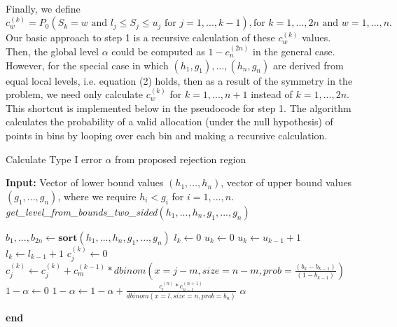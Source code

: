 \documentclass[article]{jss}
\begin{document}
Finally, we define
%
\begin{equation*}
    c_{w}^{(k)} = P_{0}(S_{k} = w \textrm{ and } l_{j} \leq S_{j} \leq u_{j} \textrm{ for } j = 1, ..., k - 1), \textrm{for } k = 1, ..., 2n \textrm{ and } w = 1, ..., n.
\end{equation*}
%
Our basic approach to step 1 is a recursive calculation of these $c_{w}^{(k)}$ values. Then, the global level $\alpha$ could be computed as $1 - c_{n}^{(2n)}$ in the general case. However, for the special case in which $(h_{1}, g_{1}), ..., (h_{n}, g_{n})$ are derived from equal local levels, i.e. equation (2) holds, then as a result of the symmetry in the problem, we need only calculate $c_{w}^{(k)}$ for $k = 1, ..., n+1$ instead of $k = 1, ... , 2n$. This shortcut is implemented below in the pseudocode for step 1. The algorithm calculates the probability of a valid allocation (under the null hypothesis) of points in bins by looping over each bin and making a recursive calculation.
\begin{algorithm}[H]
\caption{Calculate Type I error $\alpha$ from proposed rejection region}
\textbf{Input:} Vector of lower bound values $(h_{1}, ..., h_{n})$, vector of upper bound values $(g_{1}, ..., g_{n})$, where we require $h_{i} < g_{i}$ for $i = 1, ..., n$.
\newline
\textit{get\_level\_from\_bounds\_two\_sided}$(h_{1}, ..., h_{n}, g_{1}, ..., g_{n})$
\begin{algorithmic}[1]
\STATE $b_{1}, ..., b_{2n} \leftarrow \textbf{sort}(h_{1}, ..., h_{n}, g_{1}, ..., g_{n})$
\STATE $l_{k} \leftarrow 0$
\STATE $u_{k} \leftarrow 0$
\STATE $u_{k} \leftarrow u_{k - 1} + 1$
\ENDIF
{}
\STATE $l_{k} \leftarrow l_{k - 1} + 1$
\ENDIF
{}
\STATE $c_{j}^{(k)} \leftarrow 0 $
\STATE $c_{j}^{(k)} \leftarrow  c_{j}^{(k)} + c_{m}^{(k - 1)} * dbinom(x = j - m, size = n-m, prob = \frac{(b_{k} - b_{k - 1})}{(1 - b_{k - 1})})$
\ENDFOR
\ENDFOR
\ENDFOR
\STATE $1 - \alpha \leftarrow 0$
\STATE $1 - \alpha \leftarrow 1 - \alpha + \frac{c_{l}^{(n)} * c_{n - l}^{(n + 1)}}{dbinom(x = l, size = n, prob = b_{n})}$
\ENDFOR
\RETURN $\alpha$
\end{algorithmic}
\textbf{end}
\end{algorithm}
\end{document}
